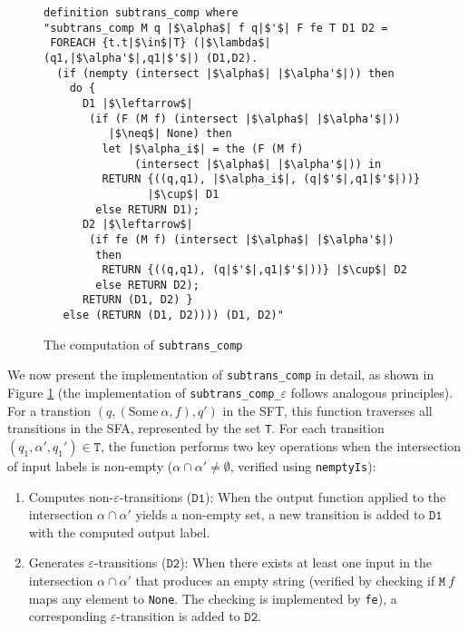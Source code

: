 \begin{figure}[hbt!]
\begin{lstlisting}
definition subtrans_comp where
"subtrans_comp M q |$\alpha$| f q|$'$| F fe T D1 D2 =
 FOREACH {t.t|$\in$|T} (|$\lambda$| (q1,|$\alpha'$|,q1|$'$|) (D1,D2).
  (if (nempty (intersect |$\alpha$| |$\alpha'$|)) then
    do {
      D1 |$\leftarrow$| 
       (if (F (M f) (intersect |$\alpha$| |$\alpha'$|)) 
          |$\neq$| None) then
         let |$\alpha_i$| = the (F (M f) 
              (intersect |$\alpha$| |$\alpha'$|)) in
         RETURN {((q,q1), |$\alpha_i$|, (q|$'$|,q1|$'$|))} 
                |$\cup$| D1
        else RETURN D1);
      D2 |$\leftarrow$| 
       (if fe (M f) (intersect |$\alpha$| |$\alpha'$|) 
        then 
         RETURN {((q,q1), (q|$'$|,q1|$'$|))} |$\cup$| D2 
        else RETURN D2);
      RETURN (D1, D2) }
   else (RETURN (D1, D2)))) (D1, D2)"
    \end{lstlisting}
    \caption{The computation of \texttt{subtrans\_comp}}
    \label{fig-def-subtrans_comp}
    \end{figure}


    We now present the implementation of \texttt{subtrans\_comp} in detail, as shown in Figure \ref{fig-def-subtrans_comp} (the implementation of \texttt{subtrans\_comp\_$\varepsilon$} follows analogous principles). For a transtion $(q, (\text{Some}~\alpha, f), q')$ in the SFT, this function traverses all transitions in the SFA, represented by the set \texttt{T}. For each transition $(q_1, \alpha', q_1')\in \texttt{T}$, the function performs two key operations when the intersection of input labels is non-empty ($\alpha \cap \alpha' \neq \emptyset$, verified using \texttt{nemptyIs}):

    \begin{enumerate}
      \item Computes non-$\varepsilon$-transitions ($\texttt{D1}$): When the output function applied to the intersection $\alpha \cap \alpha'$ yields a non-empty set, a new transition is added to $\texttt{D1}$ with the computed output label.
      \item Generates $\varepsilon$-transitions ($\texttt{D2}$): When there exists at least one input in the intersection $\alpha \cap \alpha'$ that produces an empty string (verified by checking if $\texttt{M}~f$ maps any element to \texttt{None}. The checking is implemented by \texttt{fe}), a corresponding $\varepsilon$-transition is added to $\texttt{D2}$.
    \end{enumerate}
    

